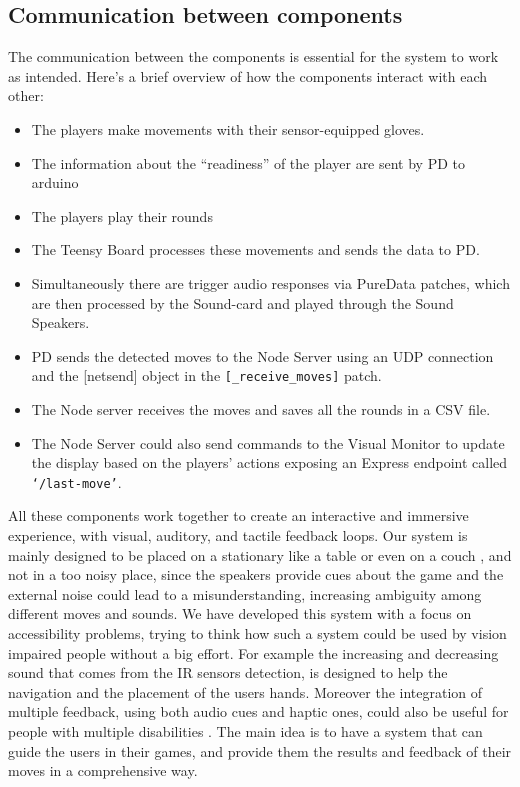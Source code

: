 \documentclass[11pt,a4paper]{report}
\begin{document}
\subsection*{Communication between components}
The communication between the components is essential for the system to work as intended. Here's a brief overview of how the components interact with each other:
\begin{itemize}
  \item The players make movements with their sensor-equipped gloves.
  \item The information about the “readiness” of the player are sent by PD to arduino
  \item The players play their rounds
  \item The Teensy Board processes these movements and sends the data to PD.
  \item Simultaneously there are trigger audio responses via PureData patches, which are then processed by the Sound-card and played through the Sound Speakers.
  \item PD sends the detected moves to the Node Server using an UDP connection and the [netsend] object in the \texttt{[\_receive\_moves]} patch.
  \item The Node server receives the moves and saves all the rounds in a CSV file.
  \item The Node Server could also send commands to the Visual Monitor to update the display based on the players' actions exposing an Express endpoint called \texttt{‘/last-move’}.
\end{itemize}

\noindent All these components work together to create an interactive and immersive experience, with visual, auditory, and tactile feedback loops.
Our system is mainly designed to be placed on a stationary like a table or even on a couch , and not in a too noisy place, since the speakers provide cues about the game and the external noise could lead to a misunderstanding, increasing ambiguity among different moves and sounds.
We have developed this system with a focus on accessibility problems, trying to think how such a system could be used by vision impaired people without a big effort.
For example the increasing and decreasing sound that comes from the IR sensors detection, is designed to help the navigation and the placement of the users hands.
Moreover the integration of multiple feedback, using both audio cues and haptic ones, could also be useful for people with multiple disabilities \cite*{2}.
The main idea is to have a system that can guide the users in their games, and provide them the results and feedback of their moves in a comprehensive way.
\end{document}

